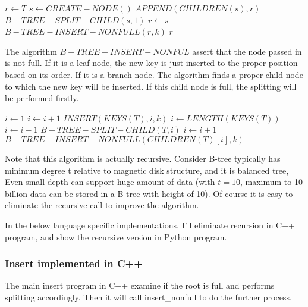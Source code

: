 \documentclass{article}
\begin{document}
\begin{algorithmic}[1]
  \State $r \leftarrow T$
    \State $s \leftarrow CREATE-NODE()$
    \State $APPEND(CHILDREN(s), r)$
    \State $B-TREE-SPLIT-CHILD(s, 1)$
    \State $r \leftarrow s$
  \EndIf
  \State $B-TREE-INSERT-NONFULL(r, k)$
  \State \Return $r$
\EndFunction
\end{algorithmic}

The algorithm $B-TREE-INSERT-NONFUL$ assert that the node passed in
is not full. If it is a leaf node, the new key is just inserted to
the proper position based on its order. If it is a branch node. The algorithm
finds a proper child node to which the new key will be inserted.
If this child node is full, the splitting will be performed firstly.

\begin{algorithmic}[1]
    \State $i \leftarrow 1$
      \State $i \leftarrow i+1$
    \EndWhile
    \State $INSERT(KEYS(T), i, k)$
  \Else
    \State $i \leftarrow LENGTH(KEYS(T))$
      \State $i \leftarrow i-1$
    \EndWhile
      \State $B-TREE-SPLIT-CHILD(T, i)$
        \State $i \leftarrow i+1$
      \EndIf
    \EndIf
    \State $B-TREE-INSERT-NONFULL(CHILDREN(T)[i], k)$
  \EndIf
\EndProcedure
\end{algorithmic}

Note that this algorithm is actually recursive. Consider B-tree typically
has minimum degree t relative to magnetic disk structure, and it is balanced
tree, Even small depth can support huge amount of data
(with $t=10$, maximum to 10 billion data can be stored in a B-tree with height of 10).
Of course it is easy to eliminate the recursive call to improve the algorithm.

In the below language specific implementations, I'll eliminate recursion in
C++ program, and show the recursive version in Python program.

\subsubsection*{Insert implemented in C++}
The main insert program in C++ examine if the root is full and performs splitting
accordingly. Then it will call insert\_nonfull to do the further process.
\end{document}
